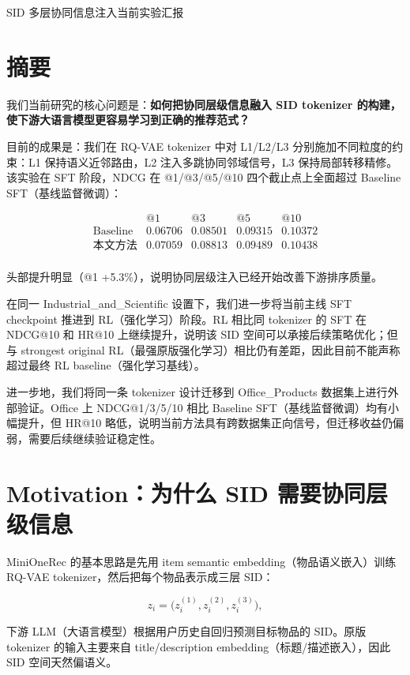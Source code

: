\documentclass[11pt]{article}
\begin{document}
{\LARGE SID 多层协同信息注入当前实验汇报}

\vspace{0.4\baselineskip}

\section{摘要}

我们当前研究的核心问题是：\textbf{如何把协同层级信息融入 SID tokenizer 的构建，使下游大语言模型更容易学习到正确的推荐范式？}

目前的成果是：我们在 RQ-VAE tokenizer 中对 L1/L2/L3 分别施加不同粒度的约束：L1 保持语义近邻路由，L2 注入多跳协同邻域信号，L3 保持局部转移精修。该实验在 SFT 阶段，NDCG 在 @1/@3/@5/@10 四个截止点上全面超过 Baseline SFT（基线监督微调）：

\[
\begin{array}{c|cccc}
& @1 & @3 & @5 & @10 \\ \hline
\text{Baseline} & 0.06706 & 0.08501 & 0.09315 & 0.10372 \\
\text{本文方法} & 0.07059 & 0.08813 & 0.09489 & 0.10438 \\
\end{array}
\]

头部提升明显（@1 +5.3\%），说明协同层级注入已经开始改善下游排序质量。

在同一 Industrial\_and\_Scientific 设置下，我们进一步将当前主线 SFT checkpoint 推进到 RL（强化学习）阶段。RL 相比同 tokenizer 的 SFT 在 NDCG@10 和 HR@10 上继续提升，说明该 SID 空间可以承接后续策略优化；但与 strongest original RL（最强原版强化学习）相比仍有差距，因此目前不能声称超过最终 RL baseline（强化学习基线）。

进一步地，我们将同一条 tokenizer 设计迁移到 Office\_Products 数据集上进行外部验证。Office 上 NDCG@1/3/5/10 相比 Baseline SFT（基线监督微调）均有小幅提升，但 HR@10 略低，说明当前方法具有跨数据集正向信号，但迁移收益仍偏弱，需要后续继续验证稳定性。

\section{Motivation：为什么 SID 需要协同层级信息}

MiniOneRec 的基本思路是先用 item semantic embedding（物品语义嵌入）训练 RQ-VAE tokenizer，然后把每个物品表示成三层 SID：

\[
z_i = \bigl(z_i^{(1)}, z_i^{(2)}, z_i^{(3)}\bigr),
\]

下游 LLM（大语言模型）根据用户历史自回归预测目标物品的 SID。原版 tokenizer 的输入主要来自 title/description embedding（标题/描述嵌入），因此 SID 空间天然偏语义。
\end{document}
